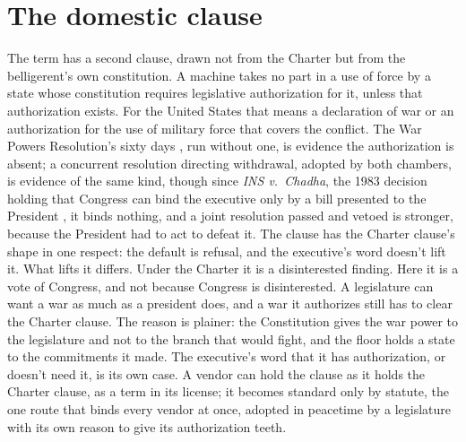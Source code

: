 \section{The domestic clause}
\label{sec:6.5}
The term has a second clause, drawn not from the Charter but from the belligerent's own constitution. A machine takes no part in a use of force by a state whose constitution requires legislative authorization for it, unless that authorization exists. For the United States that means a declaration of war or an authorization for the use of military force that covers the conflict. The War Powers Resolution's sixty days \autocite{wpr1973}, run without one, is evidence the authorization is absent; a concurrent resolution directing withdrawal, adopted by both chambers, is evidence of the same kind, though since \emph{INS v.\ Chadha}, the 1983 decision holding that Congress can bind the executive only by a bill presented to the President \autocite{chadha1983}, it binds nothing, and a joint resolution passed and vetoed is stronger, because the President had to act to defeat it. The clause has the Charter clause's shape in one respect: the default is refusal, and the executive's word doesn't lift it. What lifts it differs. Under the Charter it is a disinterested finding. Here it is a vote of Congress, and not because Congress is disinterested. A legislature can want a war as much as a president does, and a war it authorizes still has to clear the Charter clause. The reason is plainer: the Constitution gives the war power to the legislature and not to the branch that would fight, and the floor holds a state to the commitments it made. The executive's word that it has authorization, or doesn't need it, is its own case. A vendor can hold the clause as it holds the Charter clause, as a term in its license; it becomes standard only by statute, the one route that binds every vendor at once, adopted in peacetime by a legislature with its own reason to give its authorization teeth.
